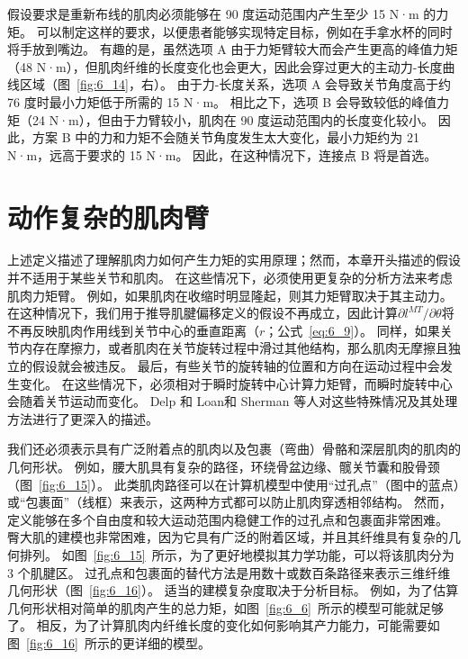 假设要求是重新布线的肌肉必须能够在 90 度运动范围内产生至少 15 N·m 的力矩。
可以制定这样的要求，以便患者能够实现特定目标，例如在手拿水杯的同时将手放到嘴边。
有趣的是，虽然选项 A 由于力矩臂较大而会产生更高的峰值力矩（48 N·m），但肌肉纤维的长度变化也会更大，因此会穿过更大的主动力-长度曲线区域（图~\ref{fig:6_14}，右）。
由于力-长度关系，选项 A 会导致关节角度高于约 76 度时最小力矩低于所需的 15 N·m。
相比之下，选项 B 会导致较低的峰值力矩（24 N·m），但由于力臂较小，肌肉在 90 度运动范围内的长度变化较小。
因此，方案 B 中的力和力矩不会随关节角度发生太大变化，最小力矩约为 21 N·m，远高于要求的 15 N·m。
因此，在这种情况下，连接点 B 将是首选。



\section{动作复杂的肌肉臂}

上述定义描述了理解肌肉力如何产生力矩的实用原理；然而，本章开头描述的假设并不适用于某些关节和肌肉。
在这些情况下，必须使用更复杂的分析方法来考虑肌肉力矩臂。
例如，如果肌肉在收缩时明显隆起，则其力矩臂取决于其主动力。
在这种情况下，我们用于推导肌腱偏移定义的假设不再成立，因此计算$\partial l^{MT} / \partial \theta$将不再反映肌肉作用线到关节中心的垂直距离（$r$；公式~\ref{eq:6_9}）。
同样，如果关节内存在摩擦力，或者肌肉在关节旋转过程中滑过其他结构，那么肌肉无摩擦且独立的假设就会被违反。
最后，有些关节的旋转轴的位置和方向在运动过程中会发生变化。
在这些情况下，必须相对于瞬时旋转中心计算力矩臂，而瞬时旋转中心会随着关节运动而变化。 
Delp 和 Loan\cite{delp1995graphics}和 Sherman 等人\cite{sherman2013moment}对这些特殊情况及其处理方法进行了更深入的描述。


我们还必须表示具有广泛附着点的肌肉以及包裹（弯曲）骨骼和深层肌肉的肌肉的几何形状。
例如，腰大肌具有复杂的路径，环绕骨盆边缘、髋关节囊和股骨颈（图~\ref{fig:6_15}）。
此类肌肉路径可以在计算机模型中使用“过孔点”（图中的蓝点）或“包裹面”（线框）来表示，这两种方式都可以防止肌肉穿透相邻结构。
然而，定义能够在多个自由度和较大运动范围内稳健工作的过孔点和包裹面非常困难。
臀大肌的建模也非常困难，因为它具有广泛的附着区域，并且其纤维具有复杂的几何排列。
如图~\ref{fig:6_15}~所示，为了更好地模拟其力学功能，可以将该肌肉分为 3 个肌腱区。
过孔点和包裹面的替代方法是用数十或数百条路径来表示三维纤维几何形状（图~\ref{fig:6_16}）。
适当的建模复杂度取决于分析目标。
例如，为了估算几何形状相对简单的肌肉产生的总力矩，如图~\ref{fig:6_6}~所示的模型可能就足够了。
相反，为了计算肌肉内纤维长度的变化如何影响其产力能力，可能需要如图~\ref{fig:6_16}~所示的更详细的模型。


